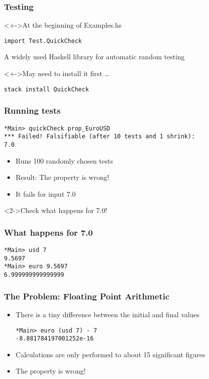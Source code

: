 \documentclass{beamer}
\begin{document}
\begin{frame}[fragile]
  \frametitle{Testing}
  \begin{block}<+->{At the beginning of Examples.hs}
\begin{verbatim}
import Test.QuickCheck
\end{verbatim}
    A widely used Haskell library for automatic random testing
  \end{block}
  \begin{block}<+->{May need to install it first \dots}
\begin{verbatim}
stack install QuickCheck
\end{verbatim}
  \end{block}
\end{frame}
\begin{frame}[fragile]
  \frametitle{Running tests}
\begin{verbatim}
*Main> quickCheck prop_EuroUSD
*** Failed! Falsifiable (after 10 tests and 1 shrink): 
7.0
\end{verbatim}
  \begin{itemize}
  \item Runs 100 randomly chosen tests
  \item Result: The property is wrong!
  \item It fails for input 7.0
  \end{itemize}
  \begin{alertblock}<2->{Check what happens for 7.0!}
    
  \end{alertblock}
\end{frame}
\begin{frame}[fragile]
  \frametitle{What happens for 7.0}
\begin{verbatim}
*Main> usd 7
9.5697
*Main> euro 9.5697
6.999999999999999
\end{verbatim}
\end{frame}
\begin{frame}[fragile]
  \frametitle{The Problem: Floating Point Arithmetic}
  \begin{itemize}
  \item  There is a tiny difference between the initial and final values 
\begin{verbatim}
*Main> euro (usd 7) - 7
-8.881784197001252e-16
\end{verbatim}
  \item Calculations are only performed to about 15 significant
    figures 
  \item  The property is wrong! 
  \end{itemize}
\end{frame}
\end{document}
